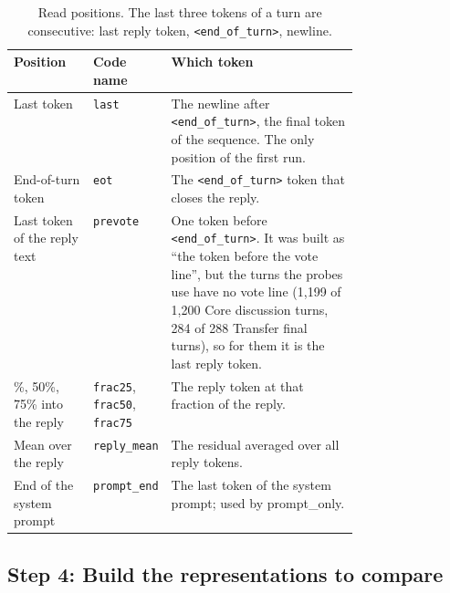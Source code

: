 \documentclass[11pt]{article}
\newcommand{\tok}[1]{\texttt{#1}}
\newcommand{\eot}{\texttt{<end\_of\_turn>}}
\begin{document}
\begin{table}[ht]\centering\small
\begin{tabularx}{\linewidth}{@{}>{\raggedright\arraybackslash}p{0.235\linewidth}>{\raggedright\arraybackslash}p{0.2\linewidth}X@{}}\toprule
Position & Code name & Which token\\\midrule
Last token & \tok{last} & The newline after \eot, the final token of the sequence. The only position of the first run.\\
End-of-turn token & \tok{eot} & The \eot{} token that closes the reply.\\
Last token of the reply text & \tok{prevote} & One token before \eot. It was built as ``the token before the vote line'', but
the turns the probes use have no vote line (1{,}199 of 1{,}200 Core discussion turns, 284 of 288 Transfer final turns), so for
them it is the last reply token.\\
25\%, 50\%, 75\% into the reply & \tok{frac25}, \tok{frac50}, \tok{frac75} & The reply token at that fraction of the reply.\\
Mean over the reply & \tok{reply\_mean} & The residual averaged over all reply tokens.\\
End of the system prompt & \tok{prompt\_end} & The last token of the system prompt; used by prompt\_only.\\
\bottomrule\end{tabularx}
\caption{Read positions. The last three tokens of a turn are consecutive: last reply token, \eot, newline.}
\label{tab:positions}
\end{table}

\subsection{Step 4: Build the representations to compare}\label{st:arms}
\end{document}
